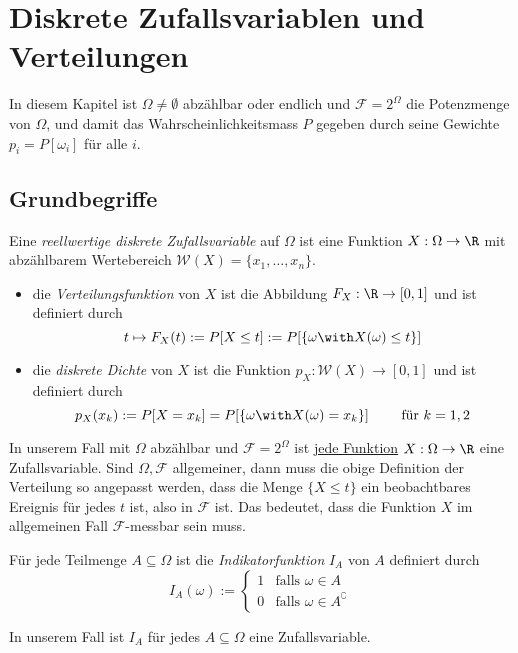 \section{Diskrete Zufallsvariablen und Verteilungen}
In diesem Kapitel ist $\Omega \neq \emptyset$ abzählbar oder endlich und $\mathcal{F} =  2^\Omega$ die Potenzmenge von $\Omega$, und damit das Wahrscheinlichkeitsmass $P$ gegeben durch seine Gewichte $p_i = P[\omega_i]$ für alle $i$.

\subsection{Grundbegriffe}
\begin{definition}
Eine \textit{reellwertige diskrete Zufallsvariable} auf $\Omega$ ist eine Funktion $X:\Omega \to \R$ mit abzählbarem Wertebereich $\mathcal{W}(X) = \{x_1,\dots,x_n\}$.
\begin{itemize}
\item die \textit{Verteilungsfunktion} von $X$ ist die Abbildung $F_X : \R \to [0,1]$ und ist definiert durch
$$ t \mapsto F_X(t) := P[X \leq t] := P[\{\omega \with X(\omega) \leq t\}]$$
\item die \textit{diskrete Dichte} von $X$ ist die Funktion $p_X : \mathcal{W}(X) \to [0,1]$ und ist definiert durch 
$$ p_X(x_k) := P[X = x_k] = P[\{\omega \with X(\omega) = x_k\}] \quad \quad \mbox{ für } k =1,2$$
\end{itemize}
\end{definition}
In unserem Fall mit $\Omega$ abzählbar und $\mathcal{F} = 2^\Omega$ ist \underline{jede Funktion} $X:\Omega \to \R$ eine Zufallsvariable. Sind $\Omega, \mathcal{F}$ allgemeiner, dann muss die obige Definition der Verteilung so angepasst werden, dass die Menge $\{X \leq t\}$ ein beobachtbares Ereignis für jedes $t$ ist, also in $\mathcal{F}$ ist. Das bedeutet, dass die Funktion $X$ im allgemeinen Fall $\mathcal{F}$-messbar sein muss.

\begin{definition}
Für jede Teilmenge $A \subseteq \Omega$ ist die \textit{Indikatorfunktion} $I_A$ von $A$ definiert durch 
$$ I_A(\omega) := \begin{cases} 1 & \mbox{falls } \omega \in A \\ 0 & \mbox{falls } \omega \in A^\complement \end{cases}$$
\end{definition}
In unserem Fall ist $I_A$ für jedes $A \subseteq \Omega$ eine Zufallsvariable.

